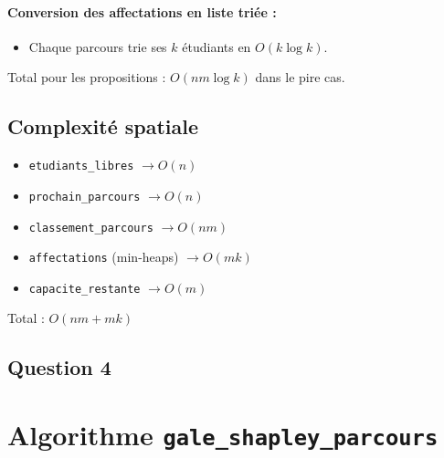 \documentclass[a4paper,11pt]{article}
\begin{document}
\paragraph{Conversion des affectations en liste triée :}
\begin{itemize}
    \item Chaque parcours trie ses $k$ étudiants en $O(k \log k)$.
\end{itemize}
Total pour les propositions : $O(nm \log k)$ dans le pire cas.

\subsection{Complexité spatiale}
\begin{itemize}
    \item \texttt{etudiants\_libres} $\rightarrow O(n)$
    \item \texttt{prochain\_parcours} $\rightarrow O(n)$
    \item \texttt{classement\_parcours} $\rightarrow O(nm)$
    \item \texttt{affectations} (min-heaps) $\rightarrow O(mk)$
    \item \texttt{capacite\_restante} $\rightarrow O(m)$
\end{itemize}
Total : $O(nm + mk)$


\subsection*{Question 4}

\section{Algorithme \texttt{gale\_shapley\_parcours}}
\end{document}
